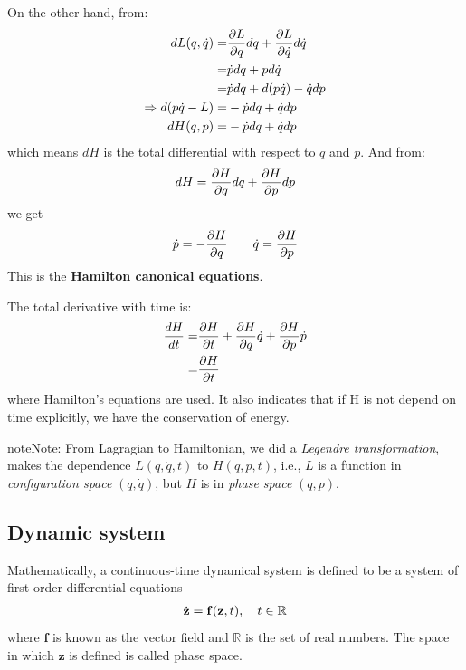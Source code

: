 \documentclass[letterpaper,10pt,english]{sphinxmanual}
\begin{document}
On the other hand, from:
\begin{gather}
\begin{split}dL(q,\dot{q})=&\frac{\partial L}{\partial q}dq+\frac{\partial L}{\partial \dot{q}}d\dot{q} \\
=&\dot{p}dq+pd\dot{q}\\
=&\dot{p}dq+d(p\dot{q})-\dot{q}dp\\
\Rightarrow d(p\dot{q}-L)=&-\dot{p}dq+\dot{q}dp\\
  dH(q,p)=&-\dot{p}dq+\dot{q}dp\end{split}\notag
\end{gather}
which means \(dH\) is the total differential with respect to \(q\) and \(p\). And from:
\begin{gather}
\begin{split}dH=\frac{\partial H}{\partial q}dq+\frac{\partial H}{\partial p}dp\end{split}\notag
\end{gather}
we get
\begin{gather}
\begin{split}\dot{p}=-\frac{\partial H}{\partial q} \qquad \dot{q}=\frac{\partial H}{\partial p}\end{split}\notag
\end{gather}
This is the \textbf{Hamilton canonical equations}.

The total derivative with time is:
\begin{gather}
\begin{split}\frac{dH}{dt}=&\frac{\partial H}{\partial t}+\frac{\partial H}{\partial q}\dot{q}+\frac{\partial H}{\partial p}\dot{p} \\
=&\frac{\partial H}{\partial t}\end{split}\notag
\end{gather}
where Hamilton's equations are used. It also indicates that if H is not depend on time explicitly, we have the conservation of energy.

\begin{notice}{note}{Note:}
From Lagragian to Hamiltonian, we did a \emph{Legendre transformation}, makes the dependence \(L(q,\dot{q},t)\) to \(H(q,p,t)\), i.e., \(L\) is a function in \emph{configuration space} \((q,\dot{q})\), but \(H\) is in \emph{phase space} \((q,p)\).
\end{notice}


\subsection{Dynamic system}
\label{CM/Lagrangian:dynamic-system}\label{CM/Lagrangian:id3}
Mathematically, a continuous-time dynamical system is defined to be a system of first order differential equations
\begin{gather}
\begin{split}\dot{\mathbf{z}} = \mathbf{f}(\mathbf{z}, t) , \quad t \in \mathbb{R}\end{split}\notag
\end{gather}
where \(\mathbf{f}\) is known as the vector field and \(\mathbb{R}\) is the set of real numbers. The space in which \(\mathbf{z}\) is defined is called phase space.
\end{document}
